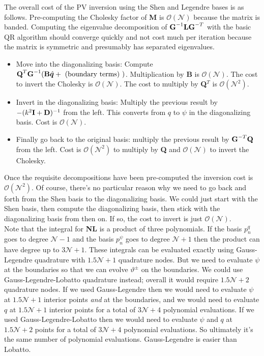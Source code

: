 \documentclass[10pt]{article}
\newcommand{\sN}{\mathcal{N}}
\newcommand{\mat}[1]{\text{\bf #1}}
\begin{document}
The overall cost of the PV inversion using the Shen and Legendre bases is as follows.
Pre-computing the Cholesky factor of {\bf M} is $\mathcal{O}(\sN)$ because the matrix is banded.
Computing the eigenvalue decomposition of $\mat{G}^{-1}\mat{L}\mat{G}^{-T}$ with the basic QR algorithm should converge quickly and not cost much per iteration because the matrix is symmetric and presumably has separated eigenvalues.
\begin{itemize}
\item Move into the diagonalizing basis: Compute $\mat{Q}^T\mat{G}^{-1}(\mat{B}\hat{\bm{q}} + \text{ (boundary terms) })$. Multiplication by {\bf B} is $\mathcal{O}(\sN)$. The cost to invert the Cholesky is $\mathcal{O}(\sN)$. The cost to multiply by {\bf Q}$^T$ is $\mathcal{O}(\sN^2)$. 
\item Invert in the diagonalizing basis: Multiply the previous result by $-(k^2\mat{I}+\mat{D})^{-1}$ from the left. This converts from $q$ to $\psi$ in the diagonalizing basis. Cost is $\mathcal{O}(\sN)$.
\item Finally go back to the original basis: multiply the previous result by $\mat{G}^{-T}\mat{Q}$ from the left. Cost is $\mathcal{O}(\sN^2)$ to multiply by {\bf Q} and $\mathcal{O}(\sN)$ to invert the Cholesky.
\end{itemize}
Once the requisite decompositions have been pre-computed the inversion cost is $\mathcal{O}(\sN^2)$.
Of course, there's no particular reason why we need to go back and forth from the Shen basis to the diagonalizing basis.
We could just start with the Shen basis, then compute the diagonalizing basis, then stick with the diagonalizing basis from then on.
If so, the cost to invert is just $\mathcal{O}(\sN)$.\\

Note that the integral for {\bf NL} is a product of three polynomials.
If the basis $p_n^q$ goes to degree $\sN-1$ and the basis $p_n^\psi$ goes to degree $\sN+1$ then the product can have degree up to $3\sN+1$.
These integrals can be evaluated exactly using Gauss-Legendre quadrature with $1.5\sN+1$ quadrature nodes.
But we need to evaluate $\psi$ at the boundaries so that we can evolve $\vartheta^\pm$ on the boundaries.
We could use Gauss-Legendre-Lobatto quadrature instead; overall it would require $1.5\sN+2$ quadrature nodes.
If we used Gauss-Legendre then we would need to evaluate $\psi$ at $1.5\sN+1$ interior points {\it and} at the boundaries, and we would need to evaluate $q$ at $1.5\sN+1$ interior points for a total of $3\sN+4$ polynomial evaluations.
If we used Gauss-Legendre-Lobatto then we would need to evaluate $\psi$ and $q$ at $1.5\sN+2$ points for a total of $3\sN+4$ polynomial evaluations.
So ultimately it's the same number of polynomial evaluations.
Gauss-Legendre is easier than Lobatto.
\end{document}
